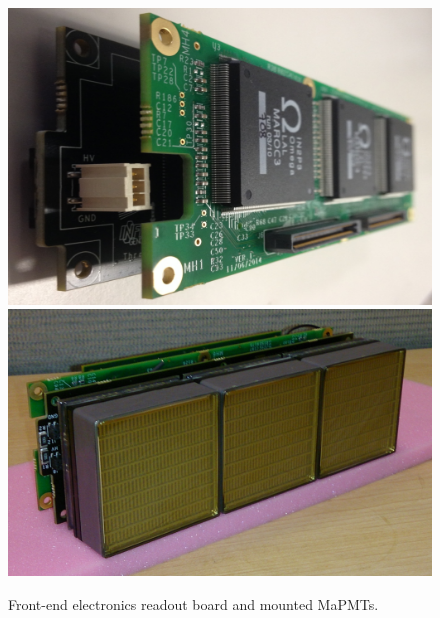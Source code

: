 \begin{figure}[htb]
  \centering
  \includegraphics[width=0.8\linewidth]{figures/fe1.pdf}
  \includegraphics[width=0.8\linewidth]{figures/frontendPMT.pdf}
  \caption{Front-end electronics readout board and mounted MaPMTs.}
  \label{fig:feboards}
\end{figure}






